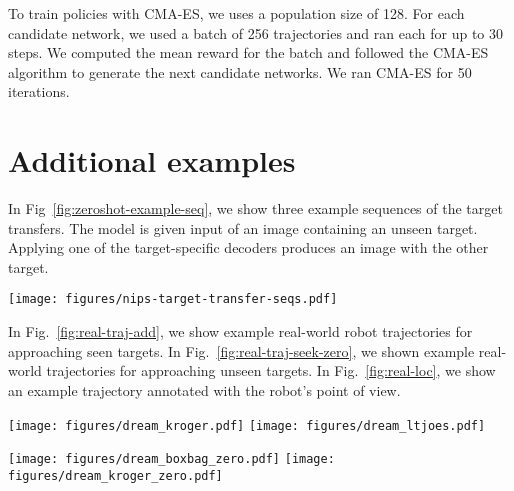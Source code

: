\documentclass[letterpaper, 10 pt, conference]{ieeeconf}
\begin{document}
To train policies with CMA-ES, we uses a population size of 128. For each candidate network, we used a batch of 256 trajectories and ran each for up to 30 steps. We computed the mean reward for the batch and followed the CMA-ES algorithm to generate the next candidate networks. We ran CMA-ES for 50 iterations.

\section{Additional examples}
In Fig~\ref{fig:zeroshot-example-seq}, we show three example sequences of the target transfers. The model is given input of an image containing an unseen target. Applying one of the target-specific decoders produces an image with the other target.

\begin{figure*}
    \centering
      \texttt{[image: figures/nips-target-transfer-seqs.pdf]}
      \caption{Example sequence of target transfer. \textbf{(a)} A sequence of an unseen bag transferred into a bottle. \textbf{(b)} An unseen volleyball transferred into a bottle. \textbf{(c)} An unseen volleyball turned into a bag.}
      \label{fig:zeroshot-example-seq}
\end{figure*}In Fig.~\ref{fig:real-traj-add}, we show example real-world robot trajectories for approaching seen targets. In Fig.~\ref{fig:real-traj-seek-zero}, we shown example real-world trajectories for approaching unseen targets. In Fig.~\ref{fig:real-loc}, we show an example trajectory annotated with the robot's point of view.

\begin{figure*}
    \centering
      \texttt{[image: figures/dream\_kroger.pdf]}
      \texttt{[image: figures/dream\_ltjoes.pdf]}
      \caption{Trajectories on the approaching task taken by the robot in the real world for various different seen targets. The target was on average 2.5 meters away from the robot.}
      \label{fig:real-traj-add}
\end{figure*}\begin{figure*}
    \centering
      \texttt{[image: figures/dream\_boxbag\_zero.pdf]}
      \texttt{[image: figures/dream\_kroger\_zero.pdf]}
      \caption{Trajectories on the approaching task taken by the robot in the real world for unseen targets.}
      \label{fig:real-traj-seek-zero}
\end{figure*}
\end{document}
